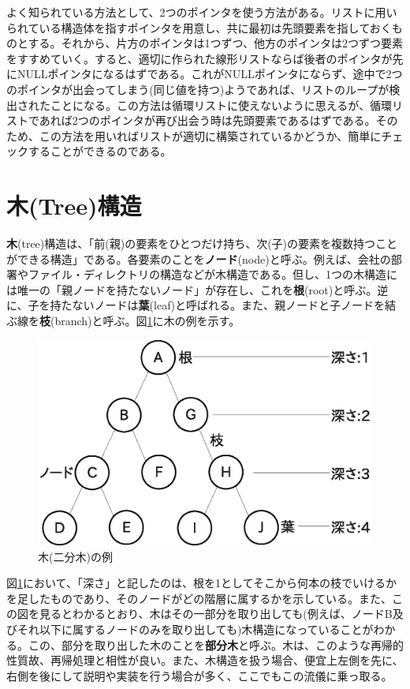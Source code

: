 よく知られている方法として、2つのポインタを使う方法がある。リストに用いられている構造体を指すポインタを用意し、共に最初は先頭要素を指しておくものとする。それから、片方のポインタは1つずつ、他方のポインタは2つずつ要素をすすめていく。すると、適切に作られた線形リストならば後者のポインタが先にNULLポインタになるはずである。これがNULLポインタにならず、途中で2つのポインタが出会ってしまう(同じ値を持つ)ようであれば、リストのループが検出されたことになる。この方法は循環リストに使えないように思えるが、循環リストであれば2つのポインタが再び出会う時は先頭要素であるはずである。そのため、この方法を用いればリストが適切に構築されているかどうか、簡単にチェックすることができるのである。

\section{木(Tree)構造}
\textbf{木}(tree)構造は、「前(親)の要素をひとつだけ持ち、次(子)の要素を複数持つことができる構造」である。各要素のことを\textbf{ノード}(node)と呼ぶ。例えば、会社の部署やファイル・ディレクトリの構造などが木構造である。但し、1つの木構造には唯一の「親ノードを持たないノード」が存在し、これを\textbf{根}(root)と呼ぶ。逆に、子を持たないノードは\textbf{葉}(leaf)と呼ばれる。また、親ノードと子ノードを結ぶ線を\textbf{枝}(branch)と呼ぶ。図\ref{tree}に木の例を示す。

\begin{figure}[htb]
\centering
\includegraphics[width=0.8\linewidth,keepaspectratio]{fig13_3.eps}
\caption{木(二分木)の例}\label{tree}
\end{figure}

図\ref{tree}において、「深さ」と記したのは、根を1としてそこから何本の枝でいけるかを足したものであり、そのノードがどの階層に属するかを示している。また、この図を見るとわかるとおり、木はその一部分を取り出しても(例えば、ノードB及びそれ以下に属するノードのみを取り出しても)木構造になっていることがわかる。この、部分を取り出した木のことを\textbf{部分木}と呼ぶ。木は、このような再帰的性質故、再帰処理と相性が良い。また、木構造を扱う場合、便宜上左側を先に、右側を後にして説明や実装を行う場合が多く、ここでもこの流儀に乗っ取る。

